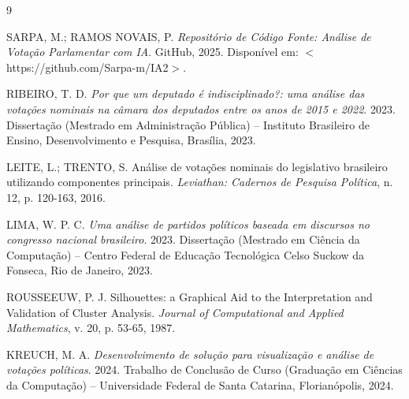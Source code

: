 \documentclass[conference]{IEEEtran}
\begin{document}
\begin{thebibliography}{9}

SARPA, M.; RAMOS NOVAIS, P. \textit{Repositório de Código Fonte: Análise de Votação Parlamentar com IA}. GitHub, 2025. Disponível em: $<$https://github.com/Sarpa-m/IA2$>$.

RIBEIRO, T. D. \textit{Por que um deputado é indisciplinado?: uma análise das votações nominais na câmara dos deputados entre os anos de 2015 e 2022}. 2023. Dissertação (Mestrado em Administração Pública) – Instituto Brasileiro de Ensino, Desenvolvimento e Pesquisa, Brasília, 2023.

LEITE, L.; TRENTO, S. Análise de votações nominais do legislativo brasileiro utilizando componentes principais. \textit{Leviathan: Cadernos de Pesquisa Política}, n. 12, p. 120-163, 2016.

LIMA, W. P. C. \textit{Uma análise de partidos políticos baseada em discursos no congresso nacional brasileiro}. 2023. Dissertação (Mestrado em Ciência da Computação) – Centro Federal de Educação Tecnológica Celso Suckow da Fonseca, Rio de Janeiro, 2023.

ROUSSEEUW, P. J. Silhouettes: a Graphical Aid to the Interpretation and Validation of Cluster Analysis. \textit{Journal of Computational and Applied Mathematics}, v. 20, p. 53-65, 1987.

KREUCH, M. A. \textit{Desenvolvimento de solução para visualização e análise de votações políticas}. 2024. Trabalho de Conclusão de Curso (Graduação em Ciências da Computação) – Universidade Federal de Santa Catarina, Florianópolis, 2024.

\end{thebibliography}
\end{document}
